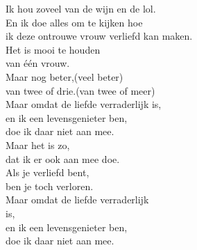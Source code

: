 \begin{translation}
Ik hou zoveel van de wijn en de lol.\\
En ik doe alles om te kijken hoe\\
ik deze ontrouwe vrouw verliefd kan maken.\\
Het is mooi te houden\\
van één vrouw.\\
Maar nog beter,(veel beter)\\
van twee of drie.(van twee of meer)\\
Maar omdat de liefde verraderlijk is,\\
en ik een levensgenieter ben,\\
doe ik daar niet aan mee.\\
Maar het is zo,\\
dat ik er ook aan mee doe.\\
Als je verliefd bent,\\
ben je toch verloren.\\
Maar omdat de liefde verraderlijk\\ is,\\
en ik een levensgenieter ben,\\
doe ik daar niet aan mee.\\
\end{translation}

